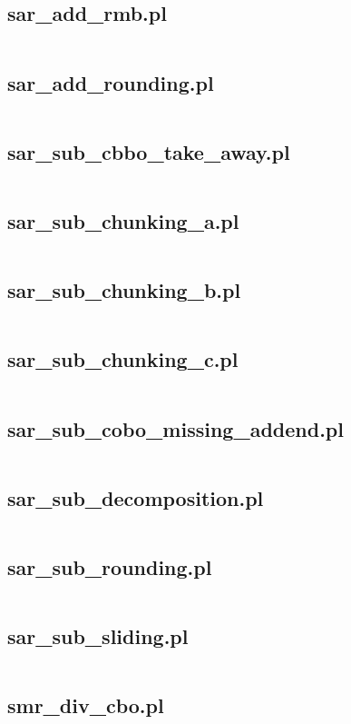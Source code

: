 \documentclass{article}
\begin{document}
\subsection{sar\_add\_rmb.pl}
\inputminted{prolog}{sar_add_rmb.pl}
\subsection{sar\_add\_rounding.pl}
\inputminted{prolog}{sar_add_rounding.pl}
\subsection{sar\_sub\_cbbo\_take\_away.pl}
\inputminted{prolog}{sar_sub_cbbo_take_away.pl}
\subsection{sar\_sub\_chunking\_a.pl}
\inputminted{prolog}{sar_sub_chunking_a.pl}
\subsection{sar\_sub\_chunking\_b.pl}
\inputminted{prolog}{sar_sub_chunking_b.pl}
\subsection{sar\_sub\_chunking\_c.pl}
\inputminted{prolog}{sar_sub_chunking_c.pl}
\subsection{sar\_sub\_cobo\_missing\_addend.pl}
\inputminted{prolog}{sar_sub_cobo_missing_addend.pl}
\subsection{sar\_sub\_decomposition.pl}
\inputminted{prolog}{sar_sub_decomposition.pl}
\subsection{sar\_sub\_rounding.pl}
\inputminted{prolog}{sar_sub_rounding.pl}
\subsection{sar\_sub\_sliding.pl}
\inputminted{prolog}{sar_sub_sliding.pl}
\subsection{smr\_div\_cbo.pl}
\inputminted{prolog}{smr_div_cbo.pl}
\end{document}
